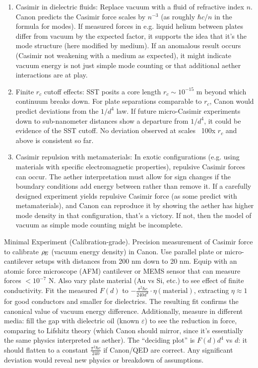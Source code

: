 \documentclass[11pt]{article}
\begin{document}
\begin{enumerate}

\item 
Casimir in dielectric fluids: Replace vacuum with a fluid of refractive index $n$. Canon predicts the Casimir force scales by $n^{-3}$ (as roughly $\hbar c/n$ in the formula for modes). If measured forces in e.g. liquid helium between plates differ from vacuum by the expected factor, it supports the idea that it’s the mode structure (here modified by medium). If an anomalous result occurs (Casimir not weakening with a medium as expected), it might indicate vacuum energy is not just simple mode counting or that additional aether interactions are at play.




\item 
Finite $r_c$ cutoff effects: SST posits a core length $r_c \sim 10^{-15}$ m beyond which continuum breaks down. For plate separations comparable to $r_c$, Canon would predict deviations from the $1/d^4$ law. If future micro-Casimir experiments down to sub-nanometer distances show a departure from $1/d^4$, it could be evidence of the SST cutoff. No deviation observed at scales ~100x $r_c$ and above is consistent so far.




\item 
Casimir repulsion with metamaterials: In exotic configurations (e.g. using materials with specific electromagnetic properties), repulsive Casimir forces can occur. The aether interpretation must allow for sign changes if the boundary conditions add energy between rather than remove it. If a carefully designed experiment yields repulsive Casimir force (as some predict with metamaterials), and Canon can reproduce it by showing the aether has higher mode density in that configuration, that’s a victory. If not, then the model of vacuum as simple mode counting might be incomplete.




\end{enumerate}

Minimal Experiment (Calibration-grade). Precision measurement of Casimir force to calibrate $\rho_{\!E}$ (vacuum energy density) in Canon. Use parallel plate or micro-cantilever setups with distances from 200 nm down to 20 nm. Equip with an atomic force microscope (AFM) cantilever or MEMS sensor that can measure forces $<10^{-7}$ N. Also vary plate material (Au vs Si, etc.) to see effect of finite conductivity. Fit the measured $F(d)$ to $-\frac{\pi^2 \hbar c}{240 d^4} \cdot \eta(\text{material})$, extracting $\eta\approx1$ for good conductors and smaller for dielectrics. The resulting fit confirms the canonical value of vacuum energy difference. Additionally, measure in different media: fill the gap with dielectric oil (known $\varepsilon$) to see the reduction in force, comparing to Lifshitz theory (which Canon should mirror, since it’s essentially the same physics interpreted as aether). The “deciding plot” is $F(d) d^4$ vs $d$: it should flatten to a constant $\frac{\pi^2 \hbar c}{240}$ if Canon/QED are correct. Any significant deviation would reveal new physics or breakdown of assumptions.
\end{document}

